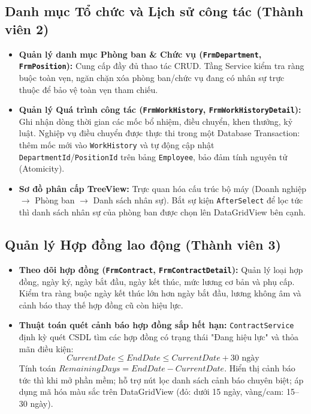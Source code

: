 \documentclass[12pt,a4paper]{report}
\begin{document}
\subsection{Danh mục Tổ chức và Lịch sử công tác (Thành viên 2)}
\begin{itemize}[leftmargin=1.0cm]
    \item \textbf{Quản lý danh mục Phòng ban \& Chức vụ (\texttt{FrmDepartment}, \texttt{FrmPosition}):} Cung cấp đầy đủ thao tác CRUD. Tầng Service kiểm tra ràng buộc toàn vẹn, ngăn chặn xóa phòng ban/chức vụ đang có nhân sự trực thuộc để bảo vệ toàn vẹn tham chiếu.
    \item \textbf{Quản lý Quá trình công tác (\texttt{FrmWorkHistory}, \texttt{FrmWorkHistoryDetail}):} Ghi nhận dòng thời gian các mốc bổ nhiệm, điều chuyển, khen thưởng, kỷ luật. Nghiệp vụ điều chuyển được thực thi trong một Database Transaction: thêm mốc mới vào \texttt{WorkHistory} và tự động cập nhật \texttt{DepartmentId}/\texttt{PositionId} trên bảng \texttt{Employee}, bảo đảm tính nguyên tử (Atomicity).
    \item \textbf{Sơ đồ phân cấp TreeView:} Trực quan hóa cấu trúc bộ máy (Doanh nghiệp $\rightarrow$ Phòng ban $\rightarrow$ Danh sách nhân sự). Bắt sự kiện \texttt{AfterSelect} để lọc tức thì danh sách nhân sự của phòng ban được chọn lên DataGridView bên cạnh.
\end{itemize}

\subsection{Quản lý Hợp đồng lao động (Thành viên 3)}
\begin{itemize}[leftmargin=1.0cm]
    \item \textbf{Theo dõi hợp đồng (\texttt{FrmContract}, \texttt{FrmContractDetail}):} Quản lý loại hợp đồng, ngày ký, ngày bắt đầu, ngày kết thúc, mức lương cơ bản và phụ cấp. Kiểm tra ràng buộc ngày kết thúc lớn hơn ngày bắt đầu, lương không âm và cảnh báo thay thế hợp đồng cũ còn hiệu lực.
    \item \textbf{Thuật toán quét cảnh báo hợp đồng sắp hết hạn:} \texttt{ContractService} định kỳ quét CSDL tìm các hợp đồng có trạng thái "Đang hiệu lực" và thỏa mãn điều kiện:
    \[
    CurrentDate \le EndDate \le CurrentDate + 30\text{ ngày}
    \]
    Tính toán $RemainingDays = EndDate - CurrentDate$. Hiển thị cảnh báo tức thì khi mở phần mềm; hỗ trợ nút lọc danh sách cảnh báo chuyên biệt; áp dụng mã hóa màu sắc trên DataGridView (đỏ: dưới 15 ngày, vàng/cam: 15--30 ngày).
\end{itemize}
\end{document}
